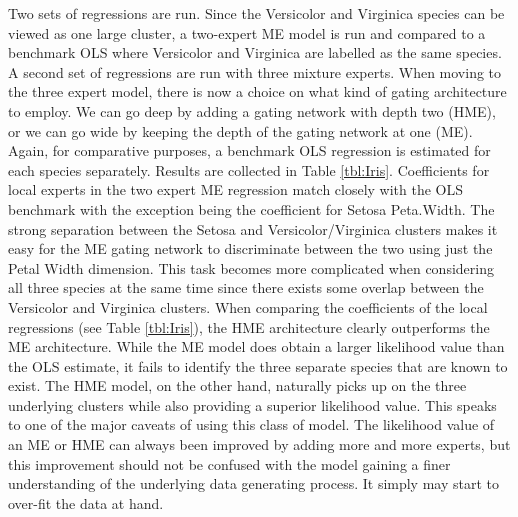 \documentclass[12pt]{article}
\theoremstyle{definition}
\begin{document}
Two sets of regressions are run. Since the Versicolor and Virginica species
can be viewed as one large cluster, a two-expert ME model is run
and compared to a benchmark OLS where Versicolor and Virginica are labelled
as the same species. A second set of regressions are run with three mixture
experts. When moving to the three expert model, there is now a choice
on what kind of gating architecture to employ. We can go deep by adding 
a gating network with depth two (HME), or we can go wide by keeping the
depth of the gating network at one (ME). Again, for comparative purposes, a benchmark
OLS regression is estimated for each species separately. Results are collected in Table \ref{tbl:Iris}.
Coefficients for local experts in the two expert ME regression match closely with the OLS
benchmark with the exception being the coefficient for Setosa Peta.Width.
The strong separation between the Setosa and Versicolor/Virginica
clusters makes it easy for the ME gating network to discriminate between the two using
just the Petal Width dimension. This task becomes more complicated when
considering all three species at the same time since there exists some overlap
between the Versicolor and Virginica clusters. When comparing the coefficients of the
local regressions (see Table \ref{tbl:Iris}), the HME architecture clearly
outperforms the ME architecture. While the ME model does obtain a larger
likelihood value than the OLS estimate, it fails to identify the three
separate species that are known to exist. The HME model, on the other hand,
naturally picks up on the three underlying clusters while also providing a superior
likelihood value. This speaks to one of the major caveats of using this class of model.
The likelihood value of an ME or HME can always been improved by adding more and
more experts, but this improvement should not be confused with the model gaining a
finer understanding of the underlying data generating process. It simply may start to
over-fit the data at hand.
\end{document}
